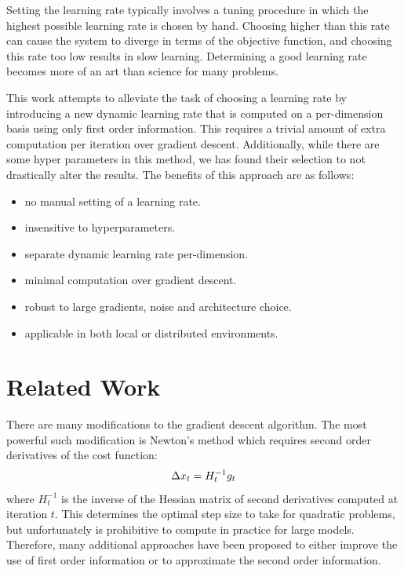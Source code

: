 \documentclass{article}
\def\BE{\vspace{-2.0mm}\begin{equation}}
\def\EE{\vspace{-1.4mm}\end{equation}}
\begin{document}
Setting the learning rate typically involves a tuning procedure in which the highest possible
learning rate is chosen by hand. Choosing higher than this rate can cause the system to diverge
in terms of the objective function, and choosing this rate too low results in slow learning.
Determining a good learning rate becomes more of an art than science for many problems.

This work attempts to alleviate the task of choosing a learning rate by introducing a new dynamic
learning rate that is computed on a per-dimension basis using only first order
information. This requires a trivial amount of extra computation per iteration over gradient
descent. Additionally, while there are some hyper parameters in this method, we has found
their selection to not drastically alter the results. The benefits of this approach are as follows:
\begin{itemize}
\item no manual setting of a learning rate.\vspace{-2mm}
\item insensitive to hyperparameters.\vspace{-2mm}
\item separate dynamic learning rate per-dimension.\vspace{-2mm}
\item minimal computation over gradient descent.\vspace{-2mm}
\item robust to large gradients, noise and architecture choice.\vspace{-2mm}
\item applicable in both local or distributed environments. \vspace{-2mm}
\end{itemize}

\section{Related Work} \label{sec:related}
There are many modifications to the gradient descent algorithm. The most powerful such
modification is Newton's method which requires second order derivatives of the cost function:
\BE
\Delta x_t = H_t^{-1} g_t
\EE
where $H_t^{-1}$ is the inverse of the Hessian matrix of second derivatives computed at iteration $t$. This
determines the optimal step size to take for quadratic problems, but unfortunately is prohibitive to
compute in practice for large models.
Therefore, many additional approaches have been proposed to either improve the use of first order
information or to approximate the second order information.
\end{document}
